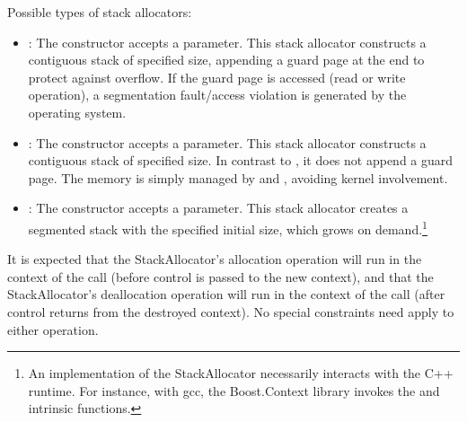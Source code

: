 Possible types of stack allocators:
\begin{itemize}
    \item {}: The constructor accepts a 
        parameter. This stack allocator constructs a contiguous stack of
        specified size, appending a guard page at the end to protect against
        overflow. If the guard page is accessed (read or write operation), a
        segmentation fault/access violation is generated by the operating
        system.
    \item {}: The constructor accepts a  parameter.
        This stack allocator constructs a contiguous stack of specified size.
        In contrast to , it does not append a guard
        page. The memory is simply managed by 
        and , avoiding kernel involvement.
    \item {}: The constructor accepts a  parameter.
        This stack allocator creates a segmented stack\cite{gccsplit} with the
        specified initial size, which grows on demand.\footnote{An
        implementation of the  StackAllocator necessarily
        interacts with the C++ runtime. For instance, with gcc, the
        Boost.Context\cite{bcontext} library invokes
        the 
        and  intrinsic
        functions.\cite{splitalloc}\citecomma\cite{bctxseg}}
\end{itemize}

It is expected that the StackAllocator's allocation operation will run in the
context of the \callcc call (before control is passed to the new context), and
that the StackAllocator's deallocation operation will run in the context of
the \dtor call (after control returns from the destroyed
context). No special constraints need apply to either operation.
